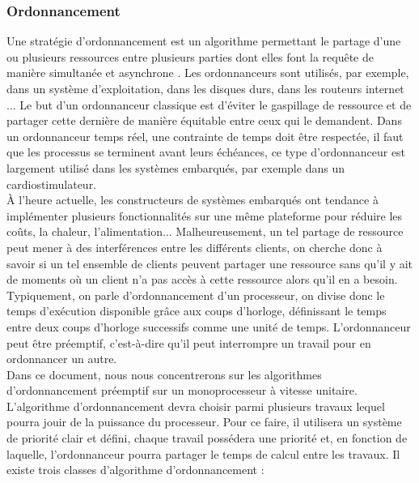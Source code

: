 \documentclass[11pt,a4paper,oneside]{book}
\theoremstyle{break}
\theoremstyle{breakplain}
\begin{document}
\subsubsection{Ordonnancement}
Une stratégie d'ordonnancement est un algorithme permettant le partage d'une ou plusieurs ressources entre plusieurs parties dont elles font la requête de manière simultanée et asynchrone \cite{goossens2014os}. Les ordonnanceurs sont utilisés, par exemple, dans un système d'exploitation, dans les disques durs, dans les routeurs internet ... Le but d'un ordonnanceur classique est d'éviter le gaspillage de ressource et de partager cette dernière de manière équitable entre ceux qui le demandent. Dans un ordonnanceur temps réel, une contrainte de temps doit être respectée, il faut que les processus se terminent avant leurs échéances, ce type d'ordonnanceur est largement utilisé dans les systèmes embarqués, par exemple dans un cardiostimulateur.\\

À l'heure actuelle, les constructeurs de systèmes embarqués ont tendance à implémenter plusieurs fonctionnalités sur une même plateforme pour réduire les coûts, la chaleur, l'alimentation... Malheureusement, un tel partage de ressource peut mener à des interférences entre les différents clients, on cherche donc à savoir si un tel ensemble de clients peuvent partager une ressource sans qu'il y ait de moments où un client n'a pas accès à cette ressource alors qu'il en a besoin.\\

Typiquement, on parle d'ordonnancement d'un processeur, on divise donc le temps d'exécution disponible grâce aux coups d'horloge, définissant le temps entre deux coups d'horloge successifs comme une unité de temps. L'ordonnanceur peut être préemptif, c'est-à-dire qu'il peut interrompre un travail pour en ordonnancer un autre.\\

Dans ce document, nous nous concentrerons sur les algorithmes d'ordonnancement préemptif sur un monoprocesseur à vitesse unitaire.\\

L'algorithme d'ordonnancement devra choisir parmi plusieurs travaux lequel pourra jouir de la puissance du processeur.  Pour ce faire, il utilisera un système de priorité clair et défini, chaque travail possédera une priorité et, en fonction de laquelle, l'ordonnanceur pourra partager le temps de calcul entre les travaux. Il existe trois classes d'algorithme d'ordonnancement \cite{goossens2014os} :\\
\end{document}
